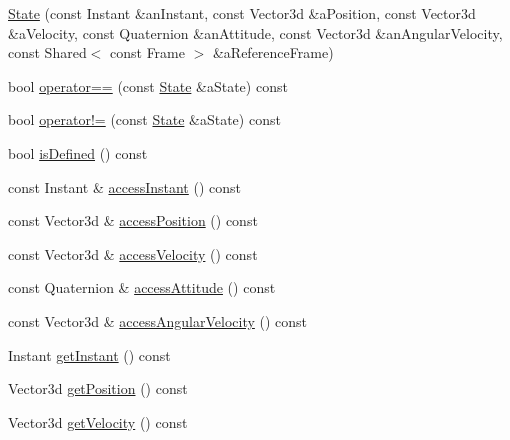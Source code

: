 \begin{DoxyCompactItemize}
\item 
\hyperlink{classostk_1_1astro_1_1flight_1_1profile_1_1_state_ac6e83efb0a774d9cbdb94c02ee17d87b}{State} (const Instant \&an\+Instant, const Vector3d \&a\+Position, const Vector3d \&a\+Velocity, const Quaternion \&an\+Attitude, const Vector3d \&an\+Angular\+Velocity, const Shared$<$ const Frame $>$ \&a\+Reference\+Frame)
\item 
bool \hyperlink{classostk_1_1astro_1_1flight_1_1profile_1_1_state_a4f6023c3c1d9590ec701bf10b0724ebf}{operator==} (const \hyperlink{classostk_1_1astro_1_1flight_1_1profile_1_1_state}{State} \&a\+State) const
\item 
bool \hyperlink{classostk_1_1astro_1_1flight_1_1profile_1_1_state_a300ff5bdda0b2bba50912f95287aba5e}{operator!=} (const \hyperlink{classostk_1_1astro_1_1flight_1_1profile_1_1_state}{State} \&a\+State) const
\item 
bool \hyperlink{classostk_1_1astro_1_1flight_1_1profile_1_1_state_ab69f291582ca4b31c9f340d9d5f83269}{is\+Defined} () const
\item 
const Instant \& \hyperlink{classostk_1_1astro_1_1flight_1_1profile_1_1_state_a6537111ca0de878dc9ccba7fbc037d41}{access\+Instant} () const
\item 
const Vector3d \& \hyperlink{classostk_1_1astro_1_1flight_1_1profile_1_1_state_a690408a5ae6d20d7812f797d20310557}{access\+Position} () const
\item 
const Vector3d \& \hyperlink{classostk_1_1astro_1_1flight_1_1profile_1_1_state_a8848af51a3b34d49f036e4a9a57231cf}{access\+Velocity} () const
\item 
const Quaternion \& \hyperlink{classostk_1_1astro_1_1flight_1_1profile_1_1_state_ad2ce6847d15311d2d1cb7a3662a1d5e4}{access\+Attitude} () const
\item 
const Vector3d \& \hyperlink{classostk_1_1astro_1_1flight_1_1profile_1_1_state_ad0118d95481db7a1bee0820aa20720af}{access\+Angular\+Velocity} () const
\item 
Instant \hyperlink{classostk_1_1astro_1_1flight_1_1profile_1_1_state_aef2c7d2c1f6831280e3933bb2d83a290}{get\+Instant} () const
\item 
Vector3d \hyperlink{classostk_1_1astro_1_1flight_1_1profile_1_1_state_ae68367f0e69fed7fc30660fc2cf98c1c}{get\+Position} () const
\item 
Vector3d \hyperlink{classostk_1_1astro_1_1flight_1_1profile_1_1_state_a6a814a57938b83db9ad8a7e13ff3ea2e}{get\+Velocity} () const
\item 

\end{DoxyCompactItemize}

